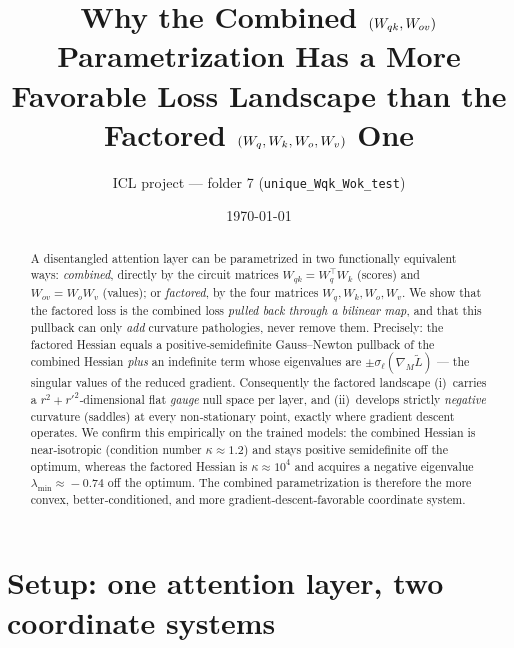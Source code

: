 \documentclass[11pt]{article}
\title{\bfseries Why the Combined $(\Wqk,\Wov)$ Parametrization Has a More\\
Favorable Loss Landscape than the Factored $(\Wq,\Wk,\Wo,\Wv)$ One}
\author{ICL project --- folder 7 (\texttt{unique\_Wqk\_Wok\_test})}
\date{\today}
\theoremstyle{remark}
\newcommand{\Wqk}{W_{qk}}
\newcommand{\Wov}{W_{ov}}
\newcommand{\Wq}{W_{q}}
\newcommand{\Wk}{W_{k}}
\newcommand{\Wo}{W_{o}}
\newcommand{\Wv}{W_{v}}
\begin{document}
\maketitle

\begin{abstract}
A disentangled attention layer can be parametrized in two functionally
equivalent ways: \emph{combined}, directly by the circuit matrices
$\Wqk=\Wq^{\!\top}\Wk$ (scores) and $\Wov=\Wo\Wv$ (values); or \emph{factored},
by the four matrices $\Wq,\Wk,\Wo,\Wv$. We show that the factored
loss is the combined loss \emph{pulled back through a bilinear map}, and that
this pullback can only \emph{add} curvature pathologies, never remove them.
Precisely: the factored Hessian equals a positive‑semidefinite Gauss--Newton
pullback of the combined Hessian \emph{plus} an indefinite term whose
eigenvalues are $\pm\sigma_\ell(\nabla_M\widetilde{L})$ --- the singular values of
the reduced gradient. Consequently the factored landscape (i)~carries a
$r^2{+}r'^2$‑dimensional flat \emph{gauge} null space per layer, and (ii)~develops
strictly \emph{negative} curvature (saddles) at every non‑stationary point,
exactly where gradient descent operates. We confirm this empirically on the
trained models: the combined Hessian is near‑isotropic (condition number
$\kappa\!\approx\!1.2$) and stays positive semidefinite off the optimum, whereas
the factored Hessian is $\kappa\!\approx\!10^4$ and acquires a negative
eigenvalue $\lambda_{\min}\!\approx\!-0.74$ off the optimum. The combined
parametrization is therefore the more convex, better‑conditioned, and
more gradient‑descent‑favorable coordinate system.
\end{abstract}

\section{Setup: one attention layer, two coordinate systems}\label{sec:setup}
\end{document}
